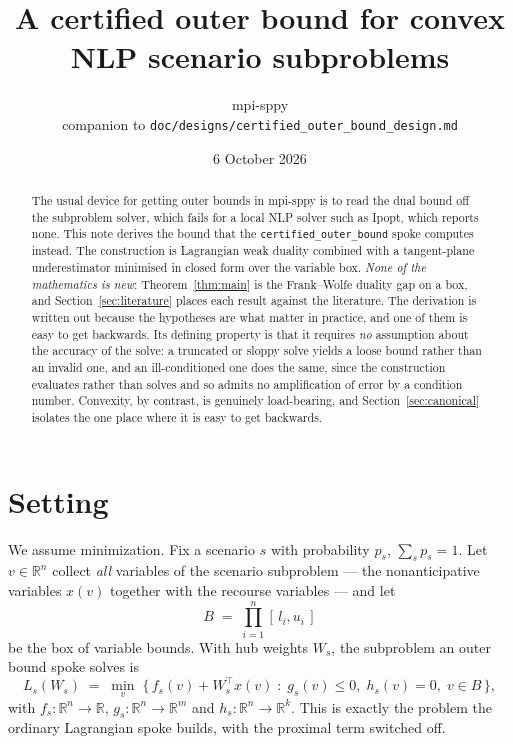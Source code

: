 \documentclass[11pt]{article}
\title{A certified outer bound for convex NLP scenario subproblems}
\author{mpi-sppy \\ \small companion to \texttt{doc/designs/certified\_outer\_bound\_design.md}}
\date{6 October 2026}
\theoremstyle{plain}
\theoremstyle{remark}
\newcommand{\R}{\mathbb{R}}
\newcommand{\W}{W}
\begin{document}
\maketitle

\begin{abstract}
The usual device for getting outer bounds in mpi-sppy is to read the dual bound off the subproblem solver, which fails for a local NLP solver such as Ipopt, which reports none.  This note
derives the bound that the \texttt{certified\_outer\_bound} spoke computes instead.
The construction is Lagrangian weak duality combined with a tangent-plane
underestimator minimised in closed form over the variable box.  \emph{None of the
mathematics is new}: Theorem~\ref{thm:main} is the Frank--Wolfe duality gap on a
box, and Section~\ref{sec:literature} places each result against the
literature.  The derivation is written out because the hypotheses are what
matter in practice, and one of them is easy to get backwards.  Its defining
property is that it requires \emph{no} assumption about the accuracy of the
solve: a truncated or sloppy solve yields a loose bound rather than an invalid
one, and an ill-conditioned one does the same, since the construction evaluates
rather than solves and so admits no amplification of error by a condition
number.  Convexity, by contrast, is genuinely load-bearing, and
Section~\ref{sec:canonical} isolates the one place where it is easy to get
backwards.
\end{abstract}

\section{Setting}\label{sec:setting}

We assume minimization. 
Fix a scenario $s$ with probability $p_s$, $\sum_s p_s = 1$.  Let
$v \in \R^{n}$ collect \emph{all} variables of the scenario subproblem --- the
nonanticipative variables $x(v)$ together with the recourse variables --- and let
\[
  B \;=\; \prod_{i=1}^{n} [\,l_i, u_i\,]
\]
be the box of variable bounds.  With hub weights $\W_s$, the subproblem an outer bound
spoke solves is
\begin{equation}\label{eq:sub}
  L_s(\W_s) \;=\; \min_{v} \;\bigl\{\, f_s(v) + \W_s^{\top} x(v)
     \;:\; g_s(v) \le 0,\; h_s(v) = 0,\; v \in B \,\bigr\},
\end{equation}
with $f_s : \R^n \to \R$, $g_s : \R^n \to \R^{m}$ and $h_s : \R^n \to \R^{k}$.
This is exactly the problem the ordinary Lagrangian spoke builds, with the
proximal term switched off.
\end{document}

